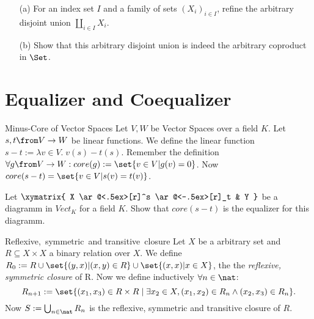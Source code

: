 \begin{exercise}
  \begin{itemize}
    \item[(a)]For an index set $I$ and a family of sets $(X_i)_{i \in I}$, refine the arbitrary disjoint union $\coprod_{i \in I}{X_i}$.
    \item[(b)]Show that this arbitrary disjoint union is indeed the arbitrary coproduct in $\Set$.
  \end{itemize}
\end{exercise}

\section{Equalizer and Coequalizer}

\begin{definition}{Minus-Core of Vector Spaces}
  Let $V, W$ be Vector Spaces over a field $K$. Let $s, t \from V \to W$ be linear functions.
  We define the linear function $s - t := \lambda v\in V. \; v(s) - t(s)$.
  Remember the definition $\forall g \from V \to W: core(g) := \set{ v \in V | g(v) = 0 }$.
  Now $core (s - t) = \set{v \in V | s(v) = t (v) }$.
\end{definition}

\begin{exercise}
  Let
  $\xymatrix{
      X \ar@<.5ex>[r]^s \ar@<-.5ex>[r]_t & Y
  }$
  be a diagramm in $Vect_K$ for a field $K$. Show that $core(s-t)$ is the equalizer for this diagramm.
\end{exercise}

\begin{definition}{Reflexive,\ symmetric\ and transitive\ closure}
  Let $X$ be a arbitrary set and $R \subseteq X \times X$ a binary relation over $X$.
  We define $R_0 := R \cup \set{ (y, x) | (x, y) \in R} \cup \set{ (x, x) | x \in X}$,
  the the \emph{reflexive, symmetric closure} of R.
  Now we define inductively $\forall n \in \nat$:
  \[R_{n+1} := \set{(x_1, x_3) \in R \times R \; | \; \exists x_2 \in X, (x_1, x_2) \in R_n \land (x_2, x_3) \in R_n}.\]
  Now $S := \bigcup_{n \in \nat}{R_n}$ is the reflexive, symmetric and transitive closure of $R$.
\end{definition}


